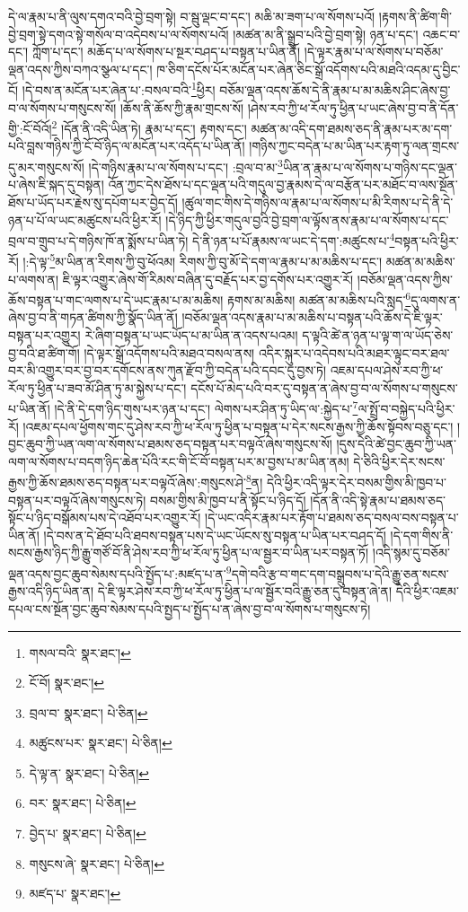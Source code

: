 དེ་ལ་རྣམ་པ་ནི་ལུས་དགའ་བའི་བྱེ་བྲག་སྟེ། བ་སྦུ་ལྡང་བ་དང་། མཆི་མ་ཟག་པ་ལ་སོགས་པའོ། །རྟགས་ནི་ཚིག་གི་བྱེ་བྲག་སྟེ་དགའ་སྟེ་གསོལ་བ་འདེབས་པ་ལ་སོགས་པའོ། །མཚན་མ་ནི་སྒྲུབ་པའི་བྱེ་བྲག་སྟེ། ཉན་པ་དང་། འཆང་བ་དང་། ཀློག་པ་དང་། མཆོད་པ་ལ་སོགས་པ་སྔར་བཤད་པ་བསྟན་པ་ཡིན་ནོ། །དེ་ལྟར་རྣམ་པ་ལ་སོགས་པ་བཅོམ་ལྡན་འདས་ཀྱིས་བཀའ་སྩལ་པ་དང་། ཁ་ཅིག་དངོས་པོར་མངོན་པར་ཞེན་ཅིང་སྒྲོ་འདོགས་པའི་མཐའི་འདམ་དུ་བྱིང་ངོ། །དེ་བས་ན་མངོན་པར་ཞེན་པ་:བསལ་བའི་\footnote{གསལ་བའི་  སྣར་ཐང་། }ཕྱིར། བཅོམ་ལྡན་འདས་ཆོས་དེ་ནི་རྣམ་པ་མ་མཆིས་ཤིང་ཞེས་བྱ་བ་ལ་སོགས་པ་གསུངས་སོ། །ཆོས་ནི་ཆོས་ཀྱི་རྣམ་གྲངས་སོ། །ཤེས་རབ་ཀྱི་ཕ་རོལ་ཏུ་ཕྱིན་པ་ཡང་ཞེས་བྱ་བ་ནི་དོན་གྱི་:ངོ་བོའོ།\footnote{ངོ་བོ།  སྣར་ཐང་། } །དོན་ནི་འདི་ཡིན་ཏེ། རྣམ་པ་དང་། རྟགས་དང་། མཚན་མ་འདི་དག་ཐམས་ཅད་ནི་རྣམ་པར་མ་དག་པའི་བླས་གཉིས་ཀྱི་ངོ་བོ་ཉིད་ལ་མངོན་པར་འདོད་པ་ཡིན་ནོ། །གཉིས་ཀྱང་བདེན་པ་མ་ཡིན་པར་རྟག་ཏུ་ལན་གྲངས་དུ་མར་གསུངས་སོ། །དེ་གཉིས་རྣམ་པ་ལ་སོགས་པ་དང་། :བྲལ་བ་མ་\footnote{བྲལ་བ་  སྣར་ཐང་།  པེ་ཅིན། }ཡིན་ན་རྣམ་པ་ལ་སོགས་པ་གཉིས་དང་ལྡན་པ་ཞེས་ཇི་སྐད་དུ་བསྟན། འོན་ཀྱང་དེས་ཐོས་པ་དང་ལྡན་པའི་གདུལ་བྱ་རྣམས་དེ་ལ་བརྩོན་པར་མཐོང་བ་ལས་སྔོན་ཐོས་པ་ཡོད་པར་རྗེས་སུ་དཔོག་པར་བྱེད་དོ། །ཚུལ་གང་གིས་དེ་གཉིས་ལ་རྣམ་པ་ལ་སོགས་པ་མི་རིགས་པ་དེ་ནི་དེ་ཉན་པ་པོ་ལ་ཡང་མཚུངས་པའི་ཕྱིར་རོ། །དེ་ཉིད་ཀྱི་ཕྱིར་གདུལ་བྱའི་བྱེ་བྲག་ལ་ལྟོས་ནས་རྣམ་པ་ལ་སོགས་པ་དང་བྲལ་བ་གྲུབ་པ་དེ་གཉིས་ཁོ་ན་སྨོས་པ་ཡིན་ཏེ། དེ་ནི་ཉན་པ་པོ་རྣམས་ལ་ཡང་དེ་དག་:མཚུངས་པ་\footnote{མཚུངས་པར་  སྣར་ཐང་།  པེ་ཅིན། }བསྟན་པའི་ཕྱིར་རོ། །:དེ་ལྟ་\footnote{དེ་ལྟ་ན་  སྣར་ཐང་།  པེ་ཅིན། }མ་ཡིན་ན་རིགས་ཀྱི་བུ་ཕོའམ། རིགས་ཀྱི་བུ་མོ་དེ་དག་ལ་རྣམ་པ་མ་མཆིས་པ་དང་། མཚན་མ་མཆིས་པ་ལགས་ན། ཇི་ལྟར་འགྱུར་ཞེས་གོ་རིམས་བཞིན་དུ་བརྗོད་པར་བྱ་དགོས་པར་འགྱུར་རོ། །བཅོམ་ལྡན་འདས་ཀྱིས་ཆོས་བསྟན་པ་གང་ལགས་པ་དེ་ཡང་རྣམ་པ་མ་མཆིས། རྟགས་མ་མཆིས། མཚན་མ་མཆིས་པའི་སླད་\footnote{བར་  སྣར་ཐང་།  པེ་ཅིན། }དུ་ལགས་ན་ཞེས་བྱ་བ་ནི་གཏན་ཚིགས་ཀྱི་སྣོད་ཡིན་ནོ། །བཅོམ་ལྡན་འདས་རྣམ་པ་མ་མཆིས་པ་བསྟན་པའི་ཆོས་དེ་ཇི་ལྟར་བསྟན་པར་འགྱུར། རེ་ཞིག་བསྟན་པ་ཡང་ཡོད་པ་མ་ཡིན་ན་འདས་པའམ། ད་ལྟའི་ཚེ་ན་ཉན་པ་ལྟ་ག་ལ་ཡོད་ཅེས་བྱ་བའི་ཐ་ཚིག་གོ། །དེ་ལྟར་སྒྲོ་འདོགས་པའི་མཐའ་བསལ་ནས། འདིར་སྐུར་པ་འདེབས་པའི་མཐར་ལྟུང་བར་ཐལ་བར་མི་འགྱུར་བར་བྱ་བར་དགོངས་ནས་ཀུན་རྫོབ་ཀྱི་བདེན་པའི་དབང་དུ་བྱས་ཏེ། འཇམ་དཔལ་ཤེས་རབ་ཀྱི་ཕ་རོལ་ཏུ་ཕྱིན་པ་ཟབ་མོ་ཤིན་ཏུ་མ་སྐྱེས་པ་དང་། དངོས་པོ་མེད་པའི་བར་དུ་བསྟན་ན་ཞེས་བྱ་བ་ལ་སོགས་པ་གསུངས་པ་ཡིན་ནོ། །དེ་ནི་དེ་དག་ཉིད་གུས་པར་ཉན་པ་དང་། ལེགས་པར་ཤིན་ཏུ་ཡིད་ལ་:སྐྱེད་པ་\footnote{བྱེད་པ་  སྣར་ཐང་།  པེ་ཅིན། }ལ་སྤྲོ་བ་བསྐྱེད་པའི་ཕྱིར་རོ། །འཇམ་དཔལ་ཕྱོགས་གང་དུ་ཤེས་རབ་ཀྱི་ཕ་རོལ་ཏུ་ཕྱིན་པ་བསྟན་པ་དེར་སངས་རྒྱས་ཀྱི་ཆོས་སྟོབས་བཅུ་དང་། །བྱང་ཆུབ་ཀྱི་ཡན་ལག་ལ་སོགས་པ་ཐམས་ཅད་བསྟན་པར་བལྟའོ་ཞེས་གསུངས་སོ། །དུས་དེའི་ཚེ་བྱང་ཆུབ་ཀྱི་ཡན་ལག་ལ་སོགས་པ་བདག་ཉིད་ཆེན་པོའི་རང་གི་ངོ་བོ་བསྟན་པར་མ་བྱས་པ་མ་ཡིན་ནམ། དེ་ཅིའི་ཕྱིར་དེར་སངས་རྒྱས་ཀྱི་ཆོས་ཐམས་ཅད་བསྟན་པར་བལྟའོ་ཞེས་:གསུངས་ཤེ་\footnote{གསུངས་ཞེ་  སྣར་ཐང་།  པེ་ཅིན། }ན། དེའི་ཕྱིར་འདི་ལྟར་དེར་བསམ་གྱིས་མི་ཁྱབ་པ་བསྟན་པར་བལྟའོ་ཞེས་གསུངས་ཏེ། བསམ་གྱིས་མི་ཁྱབ་པ་ནི་སྟོང་པ་ཉིད་དོ། །དོན་ནི་འདི་སྟེ་རྣམ་པ་ཐམས་ཅད་སྟོང་པ་ཉིད་བསྒོམས་པས་དེ་འཐོབ་པར་འགྱུར་རོ། །དེ་ཡང་འདིར་རྣམ་པར་རྟོག་པ་ཐམས་ཅད་བསལ་བས་བསྟན་པ་ཡིན་ནོ། །དེ་བས་ན་དེ་ཐོབ་པའི་ཐབས་བསྟན་པས་དེ་ཡང་ཡོངས་སུ་བསྟན་པ་ཡིན་པར་བཤད་དོ། །དེ་དག་གིས་ནི་སངས་རྒྱས་ཉིད་ཀྱི་རྒྱུ་གཙོ་བོ་ནི་ཤེས་རབ་ཀྱི་ཕ་རོལ་ཏུ་ཕྱིན་པ་ལ་སྦྱར་བ་ཡིན་པར་བསྟན་ཏོ། །འདི་སྙམ་དུ་བཅོམ་ལྡན་འདས་བྱང་ཆུབ་སེམས་དཔའི་སྤྱོད་པ་:མཛད་པ་ན་\footnote{མཛད་པ་  སྣར་ཐང་། }དགེ་བའི་རྩ་བ་གང་དག་བསྒྲུབས་པ་དེའི་རྒྱུ་ཅན་སངས་རྒྱས་འདི་ཉིད་ཡིན་ན། དེ་ཇི་ལྟར་ཤེས་རབ་ཀྱི་ཕ་རོལ་ཏུ་ཕྱིན་པ་ལ་སྦྱོར་བའི་རྒྱུ་ཅན་དུ་བསྟན་ཞེ་ན། དེའི་ཕྱིར་འཇམ་དཔལ་ངས་སྔོན་བྱང་ཆུབ་སེམས་དཔའི་སྤྱད་པ་སྤྱོད་པ་ན་ཞེས་བྱ་བ་ལ་སོགས་པ་གསུངས་ཏེ། 